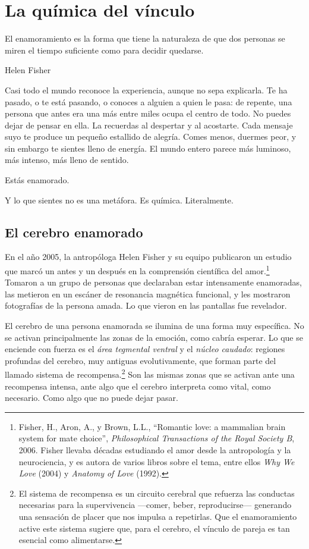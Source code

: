 \chapter{La química del vínculo}

\epigraph{El enamoramiento es la forma que tiene la naturaleza de que dos personas se miren el tiempo suficiente como para decidir quedarse.}{Helen Fisher}

Casi todo el mundo reconoce la experiencia, aunque no sepa explicarla. Te ha pasado, o te está pasando, o conoces a alguien a quien le pasa: de repente, una persona que antes era una más entre miles ocupa el centro de todo. No puedes dejar de pensar en ella. La recuerdas al despertar y al acostarte. Cada mensaje suyo te produce un pequeño estallido de alegría. Comes menos, duermes peor, y sin embargo te sientes lleno de energía. El mundo entero parece más luminoso, más intenso, más lleno de sentido.

Estás enamorado.

Y lo que sientes no es una metáfora. Es química. Literalmente.

\section{El cerebro enamorado}

En el año 2005, la antropóloga Helen Fisher y su equipo publicaron un estudio que marcó un antes y un después en la comprensión científica del amor.\footnote{Fisher, H., Aron, A., y Brown, L.L., ``Romantic love: a mammalian brain system for mate choice'', \textit{Philosophical Transactions of the Royal Society B}, 2006. Fisher llevaba décadas estudiando el amor desde la antropología y la neurociencia, y es autora de varios libros sobre el tema, entre ellos \textit{Why We Love} (2004) y \textit{Anatomy of Love} (1992).} Tomaron a un grupo de personas que declaraban estar intensamente enamoradas, las metieron en un escáner de resonancia magnética funcional, y les mostraron fotografías de la persona amada. Lo que vieron en las pantallas fue revelador.

El cerebro de una persona enamorada se ilumina de una forma muy específica. No se activan principalmente las zonas de la emoción, como cabría esperar. Lo que se enciende con fuerza es el \textit{área tegmental ventral} y el \textit{núcleo caudado}: regiones profundas del cerebro, muy antiguas evolutivamente, que forman parte del llamado sistema de recompensa.\footnote{El sistema de recompensa es un circuito cerebral que refuerza las conductas necesarias para la supervivencia ---comer, beber, reproducirse--- generando una sensación de placer que nos impulsa a repetirlas. Que el enamoramiento active este sistema sugiere que, para el cerebro, el vínculo de pareja es tan esencial como alimentarse.} Son las mismas zonas que se activan ante una recompensa intensa, ante algo que el cerebro interpreta como vital, como necesario. Como algo que no puede dejar pasar.

